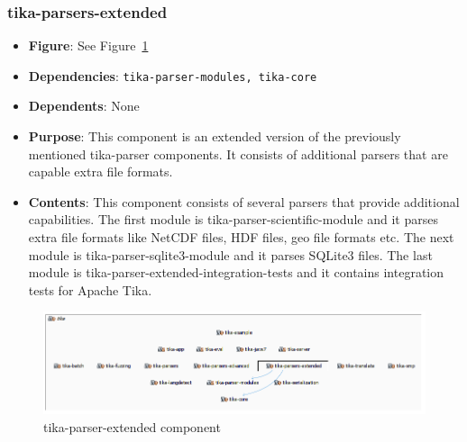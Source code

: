 \documentclass{article}
\begin{document}
\subsubsection{tika-parsers-extended}
\begin {itemize}
\item \textbf{Figure}: See Figure~\ref{fig:tika-parser-extended}
\item \textbf{Dependencies}: \texttt{tika-parser-modules, tika-core}
\item \textbf{Dependents}: None
\item \textbf{Purpose}: This component is an extended version of the previously mentioned tika-parser components. It consists of additional parsers that are capable extra file formats.
\item \textbf{Contents}: This component consists of several parsers that provide additional capabilities. The first module is tika-parser-scientific-module and it parses extra file formats like NetCDF files, HDF files, geo file formats etc. The next module is tika-parser-sqlite3-module and it parses SQLite3 files. The last module is tika-parser-extended-integration-tests and it contains integration tests for Apache Tika.
\end{itemize}
\begin{figure}[ht]
    \centering
    \includegraphics[width=1\textwidth]{report/images/tikaparserextended.PNG}
    \caption{tika-parser-extended component}
    \label{fig:tika-parser-extended}
\end{figure}
\end{document}
